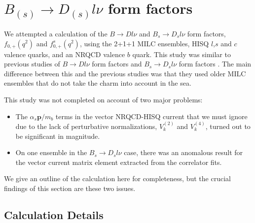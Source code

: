 \section{$B_{(s)}\to D_{(s)}l\nu$ form factors}
\label{sec:BD_BsDs_nrqcd}

We attempted a calculation of the $B\to Dl\nu$ and $B_{s}\to D_{s}l\nu$ form factors, $f_{0,+}(q^2)$ and $f^s_{0,+}(q^2)$, using the 2+1+1 MILC ensembles, HISQ $l$,$s$ and $c$ valence quarks, and an NRQCD valence $b$ quark. This study was similar to previous studies of $B\to Dl\nu$ form factors \cite{Na:2015kha} and $B_s\to D_sl\nu$ form factors \cite{Monahan:2017uby}. The main difference between this and the previous studies was that they used older MILC ensembles that do not take the charm into account in the sea.

This study was not completed on account of two major problems:
\begin{itemize}
  \item
    The $\alpha_s{\textbf{p}}/m_b$ terms in the vector NRQCD-HISQ current that we must ignore due to the lack of perturbative normalizations, $V_{k}^{(2)}$ and $V_{k}^{(4)}$, turned out to be significant in magnitude.
  \item
    On one ensemble in the $B_s\to D_s l\nu$ case, there was an anomalous result for the vector current matrix element extracted from the correlator fits.
\end{itemize}
We give an outline of the calculation here for completeness, but the crucial findings of this section are these two issues.

\subsection{Calculation Details}

